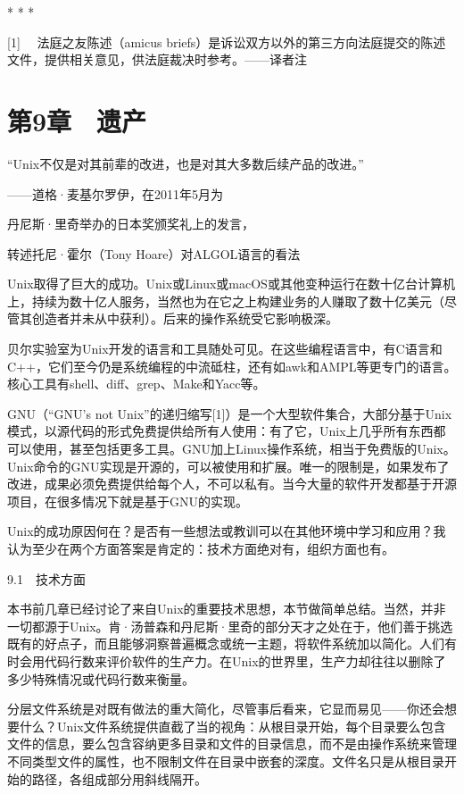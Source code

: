 \documentclass[a4paper,12pt,UTF8,twoside]{ctexbook}
\begin{document}
* * *



[1]　 法庭之友陈述（amicus briefs）是诉讼双方以外的第三方向法庭提交的陈述文件，提供相关意见，供法庭裁决时参考。——译者注





\chapter{第9章　遗产}


“Unix不仅是对其前辈的改进，也是对其大多数后续产品的改进。”

——道格·麦基尔罗伊，在2011年5月为

丹尼斯·里奇举办的日本奖颁奖礼上的发言，

转述托尼·霍尔（Tony Hoare）对ALGOL语言的看法

Unix取得了巨大的成功。Unix或Linux或macOS或其他变种运行在数十亿台计算机上，持续为数十亿人服务，当然也为在它之上构建业务的人赚取了数十亿美元（尽管其创造者并未从中获利）。后来的操作系统受它影响极深。

贝尔实验室为Unix开发的语言和工具随处可见。在这些编程语言中，有C语言和C++，它们至今仍是系统编程的中流砥柱，还有如awk和AMPL等更专门的语言。核心工具有shell、diff、grep、Make和Yacc等。

GNU（“GNU’s not Unix”的递归缩写[1]）是一个大型软件集合，大部分基于Unix模式，以源代码的形式免费提供给所有人使用：有了它，Unix上几乎所有东西都可以使用，甚至包括更多工具。GNU加上Linux操作系统，相当于免费版的Unix。Unix命令的GNU实现是开源的，可以被使用和扩展。唯一的限制是，如果发布了改进，成果必须免费提供给每个人，不可以私有。当今大量的软件开发都基于开源项目，在很多情况下就是基于GNU的实现。

Unix的成功原因何在？是否有一些想法或教训可以在其他环境中学习和应用？我认为至少在两个方面答案是肯定的：技术方面绝对有，组织方面也有。





9.1　技术方面


本书前几章已经讨论了来自Unix的重要技术思想，本节做简单总结。当然，并非一切都源于Unix。肯·汤普森和丹尼斯·里奇的部分天才之处在于，他们善于挑选既有的好点子，而且能够洞察普遍概念或统一主题，将软件系统加以简化。人们有时会用代码行数来评价软件的生产力。在Unix的世界里，生产力却往往以删除了多少特殊情况或代码行数来衡量。

分层文件系统是对既有做法的重大简化，尽管事后看来，它显而易见——你还会想要什么？Unix文件系统提供直截了当的视角：从根目录开始，每个目录要么包含文件的信息，要么包含容纳更多目录和文件的目录信息，而不是由操作系统来管理不同类型文件的属性，也不限制文件在目录中嵌套的深度。文件名只是从根目录开始的路径，各组成部分用斜线隔开。
\end{document}
